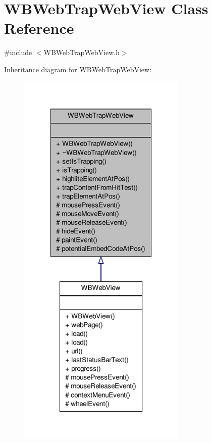 \hypertarget{class_w_b_web_trap_web_view}{\section{W\-B\-Web\-Trap\-Web\-View Class Reference}
\label{db/d78/class_w_b_web_trap_web_view}
}


{\ttfamily \#include $<$W\-B\-Web\-Trap\-Web\-View.\-h$>$}



Inheritance diagram for W\-B\-Web\-Trap\-Web\-View\-:
\nopagebreak
\begin{figure}[H]
\begin{center}
\leavevmode
\includegraphics[width=228pt]{de/d60/class_w_b_web_trap_web_view__inherit__graph}
\end{center}
\end{figure}


